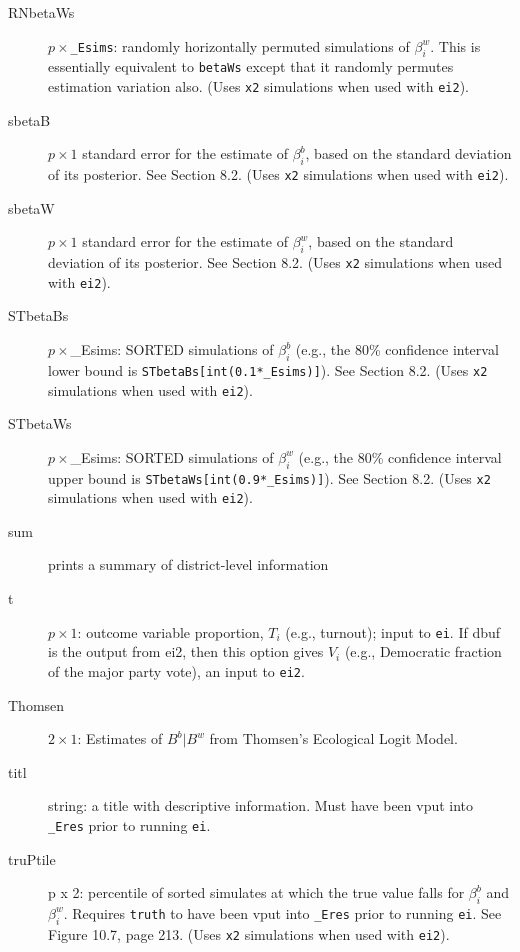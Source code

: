 \documentclass[11pt,titlepage]{article}
\begin{document}
\begin{description}
\item[RNbetaWs] $p\times$\texttt{\_Esims}: randomly horizontally
  permuted simulations of $\beta_i^w$.  This is essentially equivalent
  to \texttt{betaWs} except that it randomly permutes estimation
  variation also.  (Uses \texttt{x2} simulations when used with
  \texttt{ei2}).

\item[sbetaB] $p\times 1$ standard error for the estimate of
  $\beta_i^b$, based on the standard deviation of its posterior.  See
  Section 8.2.  (Uses \texttt{x2} simulations when used
  with \texttt{ei2}).

\item[sbetaW] $p\times 1$ standard error for the estimate of
  $\beta_i^w$, based on the standard deviation of its posterior.  See
  Section 8.2.  (Uses \texttt{x2} simulations when used
  with \texttt{ei2}).

\item[STbetaBs] $p\times$\_Esims: SORTED simulations of $\beta_i^b$
  (e.g., the 80\% confidence interval lower bound is
  \texttt{STbetaBs[int(0.1*\_Esims)]}).  See Section 8.2.
  (Uses \texttt{x2} simulations when used with \texttt{ei2}).

\item[STbetaWs] $p\times$\_Esims: SORTED simulations of $\beta_i^w$
  (e.g., the 80\% confidence interval upper bound is
  \texttt{STbetaWs[int(0.9*\_Esims)]}).  See Section 8.2.
  (Uses \texttt{x2} simulations when used with \texttt{ei2}).

\item[sum] prints a summary of district-level information

\item[t] $p\times 1$: outcome variable proportion, $T_i$ (e.g.,
  turnout); input to \texttt{ei}.  If dbuf is the output from ei2,
  then this option gives $V_i$ (e.g., Democratic fraction of the major
  party vote), an input to \texttt{ei2}.

\item[Thomsen] $2\times 1$: Estimates of $B^b|B^w$ from Thomsen's
  Ecological Logit Model.

\item[titl] string: a title with descriptive information. Must have
  been vput into \texttt{\_Eres} prior to running \texttt{ei}.

\item[truPtile] p x 2: percentile of sorted simulates at which the
  true value falls for $\beta_i^b$ and $\beta_i^w$.  Requires
  \texttt{truth} to have been vput into \texttt{\_Eres} prior to
  running \texttt{ei}. See Figure 10.7, page 213.  (Uses \texttt{x2}
  simulations when used with \texttt{ei2}).


\end{description}
\end{document}
